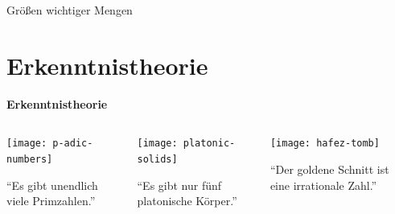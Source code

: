 \documentclass[12pt,compress,ngerman,utf8,t]{beamer}
\newcommand{\hil}[1]{{\usebeamercolor[fg]{item}{\textbf{#1}}}}
\begin{document}
\begin{frame}{Größen wichtiger Mengen}
\begin{itemize}
    \begin{center}\end{center}
  \end{itemize}
\end{frame}


\section{Erkenntnistheorie}

\begin{frame}
  \centering
  \bigskip

  \Huge \hil{Teil III}

  \bigskip
  \Large\textbf{Erkenntnistheorie}
  \par
  \normalsize
  \bigskip
  \bigskip
  \bigskip
  \bigskip

  \begin{columns}[t]
    \begin{column}{0.32\textwidth}
      \centering\texttt{[image: p-adic-numbers]}
      \medskip

      "`Es gibt unendlich viele Primzahlen."'
    \end{column}
    \begin{column}{0.32\textwidth}
      \centering\texttt{[image: platonic-solids]}
      \medskip

      "`Es gibt nur fünf platonische Körper."'
    \end{column}
    \begin{column}{0.37\textwidth}
      \centering\texttt{[image: hafez-tomb]}
      \medskip

      "`Der goldene Schnitt ist eine irrationale Zahl."'
    \end{column}
  \end{columns}
\end{frame}
\end{document}
